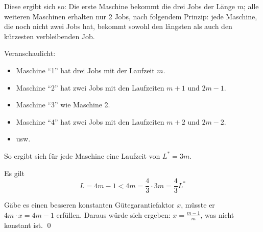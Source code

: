 \documentclass[a4paper]{scrartcl}
\begin{document}
\begin{enumerate}[label=\bfseries \arabic*.]
    Diese ergibt sich so: Die erste Maschine bekommt die drei Jobs der Länge $m$; alle weiteren Maschinen
    erhalten nur 2 Jobs, nach folgendem Prinzip: jede Maschine, die noch nicht zwei Jobs hat, bekommt
    sowohl den längsten als auch den kürzesten verbleibenden Job.

    Veranschaulicht:
    \begin{itemize}
        \item Maschine ``1'' hat drei Jobs mit der Laufzeit $m$.
        \item Maschine ``2'' hat zwei Jobs mit den Laufzeiten $m+1$ und $2m-1$.
        \item Maschine ``3'' wie Maschine 2.
        \item Maschine ``4'' hat zwei Jobs mit den Laufzeiten $m+2$ und $2m-2$.
        \item usw.
    \end{itemize}
    So ergibt sich für jede Maschine eine Laufzeit von $L^*=3m$.

    Es gilt
    \begin{equation*}
        L = 4m - 1 < 4m = \frac{4}{3} \cdot 3m = \frac{4}{3} L^\ast
    \end{equation*}

    Gäbe es einen besseren konstanten Gütegarantiefaktor $x$, müsste er $4m \cdot x = 4m-1$ erfüllen.
    Daraus würde sich ergeben:
    $x = \frac{m-1}{m}$, was nicht konstant ist.
    \qed
\end{enumerate}
\end{document}
